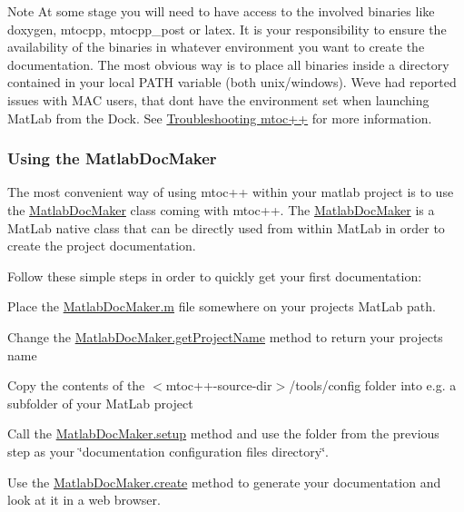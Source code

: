\begin{DoxyNote}{Note}
At some stage you will need to have access to the involved binaries like {\ttfamily doxygen}, {\ttfamily mtocpp}, {\ttfamily mtocpp\+\_\+post} or {\ttfamily latex}. It is your responsibility to ensure the availability of the binaries in whatever environment you want to create the documentation. The most obvious way is to place all binaries inside a directory contained in your local P\+A\+T\+H variable (both unix/windows). We\textquotesingle{}ve had reported issues with M\+A\+C users, that dont have the environment set when launching Mat\+Lab from the Dock. See \hyperlink{troubleshooting}{Troubleshooting mtoc++} for more information.
\end{DoxyNote}
\hypertarget{tools_tools_docmaker}{}\subsubsection{Using the Matlab\+Doc\+Maker}\label{tools_tools_docmaker}
The most convenient way of using mtoc++ within your matlab project is to use the \hyperlink{class_matlab_doc_maker}{Matlab\+Doc\+Maker} class coming with mtoc++. The \hyperlink{class_matlab_doc_maker}{Matlab\+Doc\+Maker} is a Mat\+Lab native class that can be directly used from within Mat\+Lab in order to create the project documentation.

Follow these simple steps in order to quickly get your first documentation\+:
\begin{DoxyItemize}
\item Place the \hyperlink{_matlab_doc_maker_8m_source}{Matlab\+Doc\+Maker.\+m} file somewhere on your project\textquotesingle{}s Mat\+Lab path.
\item Change the \hyperlink{class_matlab_doc_maker_a9f84ff8d3f39824b54626862780b342c}{Matlab\+Doc\+Maker.\+get\+Project\+Name} method to return your project\textquotesingle{}s name
\item Copy the contents of the {\ttfamily $<$mtoc++-\/source-\/dir$>$/tools/config} folder into e.\+g. a subfolder of your Mat\+Lab project
\item Call the \hyperlink{class_matlab_doc_maker_a434c176c2421dd18a40003919b19f4f2}{Matlab\+Doc\+Maker.\+setup} method and use the folder from the previous step as your \char`\"{}documentation configuration files directory\char`\"{}.
\item Use the \hyperlink{class_matlab_doc_maker_a278883e6b83f6c6e7780e0d567dee119}{Matlab\+Doc\+Maker.\+create} method to generate your documentation and look at it in a web browser.
\end{DoxyItemize}


